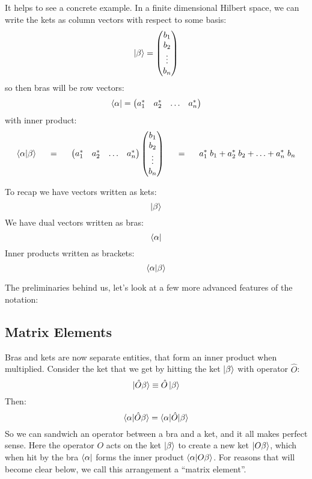 \documentclass[12pt]{book}
\begin{document}
It helps to see a concrete example.  In a finite dimensional Hilbert space, we can write the kets as column vectors with respect to some basis:
$$\ket{\beta} =
\begin{pmatrix}
           b_{1} \\
           b_{2} \\
           \vdots \\
           b_{n}
\end{pmatrix}
$$
so then bras will be row vectors:
$$\bra{\alpha} =
\begin{pmatrix}
a_{1}^* & a_{2}^* & \ldots & a_{n}^*\\
\end{pmatrix}
$$
with inner product:
$$
\braket{\alpha|\beta}
\hspace{0.5cm} = \hspace{0.5cm}
\begin{pmatrix}
a_{1}^* & a_{2}^* & \ldots & a_{n}^*\\
\end{pmatrix}
\begin{pmatrix}
           b_{1} \\
           b_{2} \\
           \vdots \\
           b_{n}
\end{pmatrix}
\hspace{0.5cm} = \hspace{0.5cm} a_1^* \; b_{1} + a_2^* \; b_{2} + \ldots + a_n^* \; b_{n}\\
$$

To recap we have vectors written as kets:
$$\ket{\beta}$$
We have dual vectors written as bras:
$$\bra{\alpha}$$
Inner products written as brackets:
$$\braket{\alpha|\beta}$$


The preliminaries behind us, let's look at a few more advanced features of the notation:

\subsection{Matrix Elements}

Bras and kets are now separate entities, that form an inner product when multiplied.  Consider the ket that we get by hitting the ket $\ket{\beta}$ with operator $\hat{O}$:
$$\ket{\hat{O}\beta} \equiv \hat{O} \ket{\beta}$$
Then:
$$\braket{\alpha|\hat{O}\beta} = \braket{\alpha|\hat{O}|\beta}$$
So we can sandwich an operator between a bra and a ket, and it all makes perfect sense.  Here the operator $O$ acts on the ket $\ket{\beta}$ to create a new ket $\ket{O\beta}$, which when hit by the bra $\bra{\alpha}$ forms the inner product $\braket{\alpha|O\beta}$.  For reasons that will become clear below, we call this arrangement a ``matrix element''.
\end{document}
